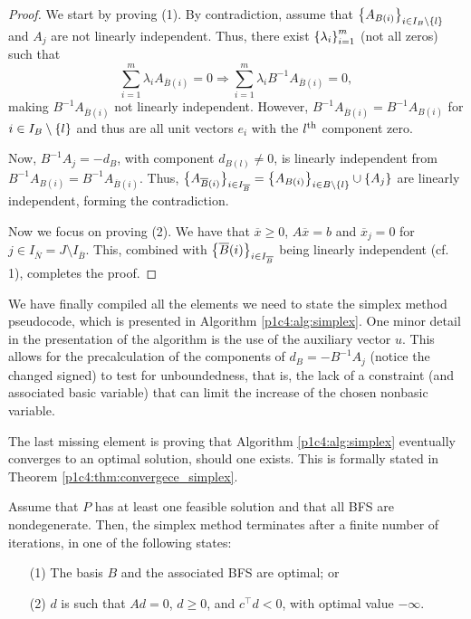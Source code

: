 \begin{proof}
	 We start by proving (1). By contradiction, assume that $\left\{ A_{B(i)} \right \}_{i \in I_B \setminus \left\{ l \right \}}$ and $A_j$ are not linearly independent. Thus, there exist $\left\{ \lambda_i \right \}_{i=1}^m$ (not all zeros) such that
	\begin{equation*}
			\sum_{i=1}^m \lambda_i A_{\overline{B}(i)} = 0 \Rightarrow \sum_{i=1}^m \lambda_i B^{-1}A_{\overline{B}(i)} = 0,
	\end{equation*}
	making $B^{-1}A_{\overline{B}(i)}$ not linearly independent. However, $B^{-1}A_{\overline{B}(i)} = B^{-1}A_{B(i)}$ for $i \in I_B \setminus \left\{ l \right \}$ and thus are all unit vectors $e_i$ with the $l^\text{th}$ component zero. 

	Now, $B^{-1}A_j = -d_B$, with component $d_{B(l)} \neq 0$, is linearly independent from $B^{-1}A_{B(i)} = B^{-1}A_{\overline{B}(i)}$. Thus, $\big\{A_{\overline{B}(i)}\big\}_{i \in I_{\overline{B}}} = \left\{ A_{B(i)} \right \}_{i \in B \setminus \left\{ l \right \}} \cup \left\{ A_j \right \}$ are linearly independent, forming the contradiction.
	
	Now we focus on proving (2). We have that $\overline{x} \geq 0$, $A\overline{x} = b$ and $\overline{x}_j = 0$ for $j \in I_{\overline{N}} = J \setminus I_{\overline{B}}$. This, combined with $\left\{ \overline{B}(i) \right \}_{i \in I_{\overline{B}}}$ being linearly independent (cf. 1), completes the proof.	
\end{proof}

We have finally compiled all the elements we need to state the simplex method pseudocode, which is presented in Algorithm \ref{p1c4:alg:simplex}. One minor detail in the presentation of the algorithm is the use of the auxiliary vector $u$. This allows for the precalculation of the components of $d_B = -B^{-1}A_j$ (notice the changed signed) to test for unboundedness, that is, the lack of a constraint (and associated basic variable) that can limit the increase of the chosen nonbasic variable. 

The last missing element is proving that Algorithm \ref{p1c4:alg:simplex} eventually converges to an optimal solution, should one exists. This is formally stated in Theorem \ref{p1c4:thm:convergece_simplex}.

\begin{theorem}\label{p1c4:thm:convergece_simplex}
	Assume that $P$ has at least one feasible solution and that all BFS are nondegenerate. Then, the simplex method terminates after a finite number of iterations, in one of the following states:
	\begin{enumerate}
		\item[(1)] The basis $B$ and the associated BFS are optimal; or
		\item[(2)] $d$ is such that $Ad = 0$, $d \geq 0$, and $c^\top d < 0$, with optimal value $-\infty$.	
	\end{enumerate}
\end{theorem}


